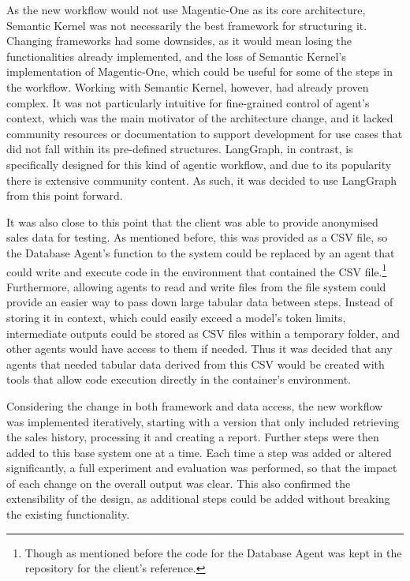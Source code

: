 \documentclass[a4paper]{report}
\begin{document}
As the new workflow would not use Magentic-One as its core architecture, Semantic Kernel was not necessarily the best framework for structuring it. Changing frameworks had some downsides, as it would mean losing the functionalities already implemented, and the loss of Semantic Kernel's implementation of Magentic-One, which could be useful for some of the steps in the workflow. Working with Semantic Kernel, however, had already proven complex. It was not particularly intuitive for fine-grained control of agent's context, which was the main motivator of the architecture change, and it lacked community resources or documentation to support development for use cases that did not fall within its pre-defined structures. LangGraph, in contrast, is specifically designed for this kind of agentic workflow, and due to its popularity there is extensive community content. As such, it was decided to use LangGraph from this point forward.

It was also close to this point that the client was able to provide anonymised sales data for testing. As mentioned before, this was provided as a CSV file, so the Database Agent's function to the system could be replaced by an agent that could write and execute code in the environment that contained the CSV file.\footnote{Though as mentioned before the code for the Database Agent was kept in the repository for the client's reference.} Furthermore, allowing agents to read and write files from the file system could provide an easier way to pass down large tabular data between steps. Instead of storing it in context, which could easily exceed a model's token limits, intermediate outputs could be stored as CSV files within a temporary folder, and other agents would have access to them if needed. Thus it was decided that any agents that needed tabular data derived from this CSV would be created with tools that allow code execution directly in the container's environment.

Considering the change in both framework and data access, the new workflow was implemented iteratively, starting with a version that only included retrieving the sales history, processing it and creating a report. Further steps were then added to this base system one at a time. Each time a step was added or altered significantly, a full experiment and evaluation was performed, so that the impact of each change on the overall output was clear. This also confirmed the extensibility of the design, as additional steps could be added without breaking the existing functionality.
\end{document}
